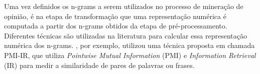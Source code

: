 \documentclass[template.tex]{subfiles}
\begin{document}
%


%
%
%
%
%
%
%
%

Uma vez definidos os n-grams a serem utilizados no processo de mineração de opinião, é na etapa de transformação que uma representação numérica é computada a partir dos n-grams obtidos da etapa de pré-processamento. Diferentes técnicas são utilizadas na literatura para calcular essa representação numérica dos n-grams. , por exemplo, utilizou uma técnica proposta em  chamada PMI-IR, que utiliza \textit{Pointwise Mutual Information} (PMI) e \textit{Information Retrieval} (IR) para medir a similaridade de pares de palavras ou frases. 
\end{document}
